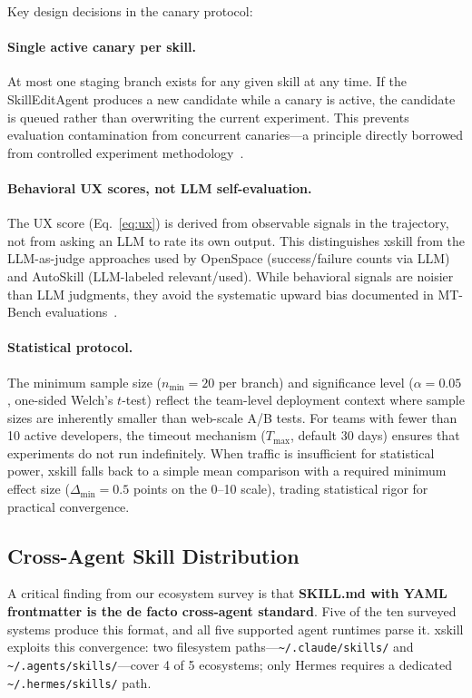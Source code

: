\documentclass[11pt]{article}
\begin{document}
Key design decisions in the canary protocol:

\paragraph{Single active canary per skill.} At most one staging branch exists for any given skill at any time. If the SkillEditAgent produces a new candidate while a canary is active, the candidate is queued rather than overwriting the current experiment. This prevents evaluation contamination from concurrent canaries---a principle directly borrowed from controlled experiment methodology~\citep{kohavi2020trustworthy}.

\paragraph{Behavioral UX scores, not LLM self-evaluation.} The UX score (Eq.~\ref{eq:ux}) is derived from observable signals in the trajectory, not from asking an LLM to rate its own output. This distinguishes xskill from the LLM-as-judge approaches used by OpenSpace (success/failure counts via LLM) and AutoSkill (LLM-labeled relevant/used). While behavioral signals are noisier than LLM judgments, they avoid the systematic upward bias documented in MT-Bench evaluations~\citep{zheng2024judging}.

\paragraph{Statistical protocol.} The minimum sample size ($n_{\min} = 20$ per branch) and significance level ($\alpha = 0.05$, one-sided Welch's $t$-test) reflect the team-level deployment context where sample sizes are inherently smaller than web-scale A/B tests. For teams with fewer than 10 active developers, the timeout mechanism ($T_{\max}$, default 30 days) ensures that experiments do not run indefinitely. When traffic is insufficient for statistical power, xskill falls back to a simple mean comparison with a required minimum effect size ($\Delta_{\min} = 0.5$ points on the 0--10 scale), trading statistical rigor for practical convergence.

\subsection{Cross-Agent Skill Distribution}
\label{sec:distribution}

A critical finding from our ecosystem survey is that \textbf{SKILL.md with YAML frontmatter is the de facto cross-agent standard}. Five of the ten surveyed systems produce this format, and all five supported agent runtimes parse it. xskill exploits this convergence: two filesystem paths---\texttt{\~{}/.claude/skills/} and \texttt{\~{}/.agents/skills/}---cover 4 of 5 ecosystems; only Hermes requires a dedicated \texttt{\~{}/.hermes/skills/} path.
\end{document}
